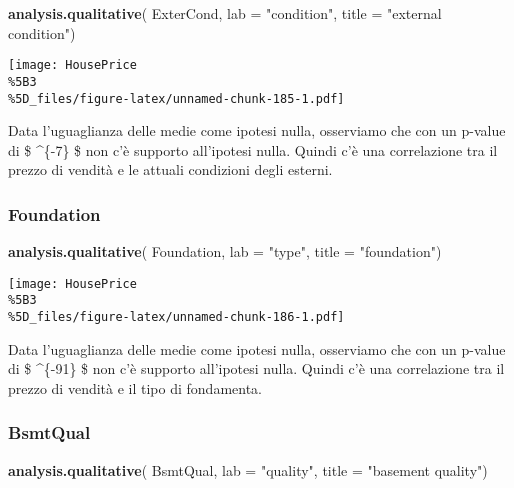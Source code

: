 \documentclass[
]{article}
\newenvironment{Shaded}{\begin{snugshade}}{\end{snugshade}}
\newcommand{\AttributeTok}[1]{\textcolor[rgb]{0.13,0.29,0.53}{#1}}
\newcommand{\FunctionTok}[1]{\textcolor[rgb]{0.13,0.29,0.53}{\textbf{#1}}}
\newcommand{\NormalTok}[1]{#1}
\newcommand{\StringTok}[1]{\textcolor[rgb]{0.31,0.60,0.02}{#1}}
\begin{document}
\begin{Shaded}
\begin{Highlighting}[]
\FunctionTok{analysis.qualitative}\NormalTok{(}
\NormalTok{    ExterCond,}
    \AttributeTok{lab =} \StringTok{"condition"}\NormalTok{,}
    \AttributeTok{title =} \StringTok{"external condition"}\NormalTok{)}
\end{Highlighting}
\end{Shaded}

\texttt{[image: HousePrice\\\%5B3\\\%5D\_files/figure-latex/unnamed-chunk-185-1.pdf]}

Data l'uguaglianza delle medie come ipotesi nulla, osserviamo che con un
p-value di \$ \^{}\{-7\} \$ non c'è supporto all'ipotesi
nulla. Quindi c'è una correlazione tra il prezzo di vendità e le attuali
condizioni degli esterni.

\subsubsection{Foundation}\label{foundation-1}

\begin{Shaded}
\begin{Highlighting}[]
\FunctionTok{analysis.qualitative}\NormalTok{(}
\NormalTok{    Foundation,}
    \AttributeTok{lab =} \StringTok{"type"}\NormalTok{,}
    \AttributeTok{title =} \StringTok{"foundation"}\NormalTok{)}
\end{Highlighting}
\end{Shaded}

\texttt{[image: HousePrice\\\%5B3\\\%5D\_files/figure-latex/unnamed-chunk-186-1.pdf]}

Data l'uguaglianza delle medie come ipotesi nulla, osserviamo che con un
p-value di \$ \^{}\{-91\} \$ non c'è supporto all'ipotesi
nulla. Quindi c'è una correlazione tra il prezzo di vendità e il tipo di
fondamenta.

\subsubsection{BsmtQual}\label{bsmtqual-1}

\begin{Shaded}
\begin{Highlighting}[]
\FunctionTok{analysis.qualitative}\NormalTok{(}
\NormalTok{    BsmtQual,}
    \AttributeTok{lab =} \StringTok{"quality"}\NormalTok{,}
    \AttributeTok{title =} \StringTok{"basement quality"}\NormalTok{)}
\end{Highlighting}
\end{Shaded}
\end{document}
